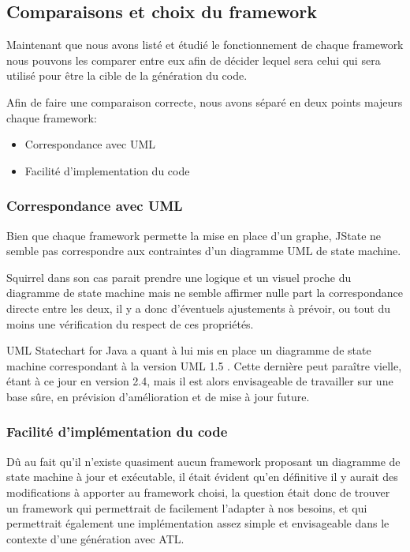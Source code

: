 \documentclass[french, 12pt, a4paper]{article}
\begin{document}
    \subsection{Comparaisons et choix du framework}
    Maintenant que nous avons listé et étudié le fonctionnement de chaque framework nous pouvons les comparer entre eux afin de décider lequel sera celui qui sera utilisé pour être la cible de la génération du code.
    
    Afin de faire une comparaison correcte, nous avons séparé en deux points majeurs chaque framework:
    \begin{itemize}
        \item Correspondance avec UML
        \item Facilité d'implementation du code
    \end{itemize}
    
        \subsubsection{Correspondance avec UML}
        Bien que chaque framework permette la mise en place d'un graphe, JState ne semble pas correspondre aux contraintes d'un diagramme UML de state machine. 
        
        Squirrel dans son cas parait prendre une logique et un visuel proche du diagramme de state machine mais ne semble affirmer nulle part la correspondance directe entre les deux, il y a donc d'éventuels ajustements à prévoir, ou tout du moins une vérification du respect de ces propriétés. 
        
        UML Statechart for Java a quant à lui mis en place un diagramme de state machine correspondant à la version UML 1.5 . Cette dernière peut paraître vielle, étant à ce jour en version 2.4, mais il est alors envisageable de travailler sur une base sûre, en prévision d'amélioration et de mise à jour future.
        
        \subsubsection{Facilité d'implémentation du code}
        Dû au fait qu'il n'existe quasiment aucun framework proposant un diagramme de state machine à jour et exécutable, il était évident qu'en définitive il y aurait des modifications à apporter au framework choisi, la question était donc de trouver un framework qui permettrait de facilement l'adapter à nos besoins, et qui permettrait également une implémentation assez simple et envisageable dans le contexte d'une génération avec ATL.
        
\end{document}
